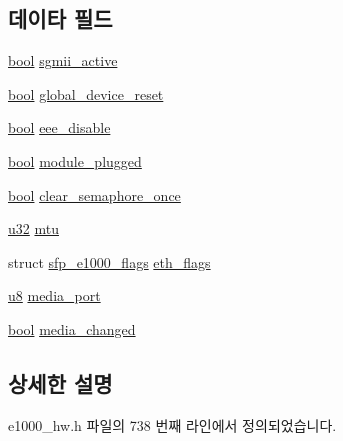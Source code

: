 \subsection*{데이타 필드}
\begin{DoxyCompactItemize}
\item 
\hyperlink{avb__gptp_8h_af6a258d8f3ee5206d682d799316314b1}{bool} \hyperlink{structe1000__dev__spec__82575_a86c1ac5e1594ce33bdd6b8acc654a02b}{sgmii\+\_\+active}
\item 
\hyperlink{avb__gptp_8h_af6a258d8f3ee5206d682d799316314b1}{bool} \hyperlink{structe1000__dev__spec__82575_abb7ee4a2b47a7aed417b505985e648e4}{global\+\_\+device\+\_\+reset}
\item 
\hyperlink{avb__gptp_8h_af6a258d8f3ee5206d682d799316314b1}{bool} \hyperlink{structe1000__dev__spec__82575_a147d593355a5b316988a14544732b4a6}{eee\+\_\+disable}
\item 
\hyperlink{avb__gptp_8h_af6a258d8f3ee5206d682d799316314b1}{bool} \hyperlink{structe1000__dev__spec__82575_a9501b5464359b87554fc32729f1b2130}{module\+\_\+plugged}
\item 
\hyperlink{avb__gptp_8h_af6a258d8f3ee5206d682d799316314b1}{bool} \hyperlink{structe1000__dev__spec__82575_a1a93b1f0a18379ceb74d60b361b5e564}{clear\+\_\+semaphore\+\_\+once}
\item 
\hyperlink{lib_2igb_2e1000__osdep_8h_a64e91c10a0d8fb627e92932050284264}{u32} \hyperlink{structe1000__dev__spec__82575_a6bf07cd0dd9e1459d63d3e38c4159bee}{mtu}
\item 
struct \hyperlink{structsfp__e1000__flags}{sfp\+\_\+e1000\+\_\+flags} \hyperlink{structe1000__dev__spec__82575_a30d7f3a82680a372df6801c1ed86578a}{eth\+\_\+flags}
\item 
\hyperlink{lib_2igb_2e1000__osdep_8h_a8baca7e76da9e0e11ce3a275dd19130c}{u8} \hyperlink{structe1000__dev__spec__82575_afad32bd92d6ecd9161275120de8b793d}{media\+\_\+port}
\item 
\hyperlink{avb__gptp_8h_af6a258d8f3ee5206d682d799316314b1}{bool} \hyperlink{structe1000__dev__spec__82575_ab7ad55be07202708d12927b26dcce99c}{media\+\_\+changed}
\end{DoxyCompactItemize}


\subsection{상세한 설명}


e1000\+\_\+hw.\+h 파일의 738 번째 라인에서 정의되었습니다.



